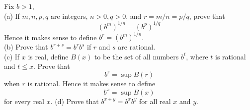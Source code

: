 











\begin{myExercise}
    Fix $b>1$,\\
    (a) If $m, n, p, q$ are integers, $n > 0, q > 0$, and $r = m/n = p/q$, prove that
    \begin{equation*}
        \left(b^m\right)^{1/n} = 
        \left(b^p\right)^{1/q}
    \end{equation*}
    Hence it makes sense to define $b^r = \left(b^m\right)^{1/n}$.\\
    (b) Prove that $b^{r+s} = b^r b^s$ if $r$ and $s$ are rational.\\
    (c) If $x$ is real, define $B(x)$ to be the set of all numbers $b^t$, where $t$ is rational and
    $t \leq x$. Prove that
    \begin{equation*}
        b^r = \sup B(r)
    \end{equation*}
    when $r$ is rational. Hence it makes sense to define
    \begin{equation*}
        b^x = \sup B(x)
    \end{equation*}
    for every real $x$.
    (d) Prove that $b^{x+y} = b^x b^y$ for all real $x$ and $y$.
\end{myExercise}

